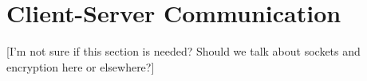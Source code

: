 \section{Client-Server Communication}
[I'm not sure if this section is needed? Should we talk about sockets and encryption here or elsewhere?]
